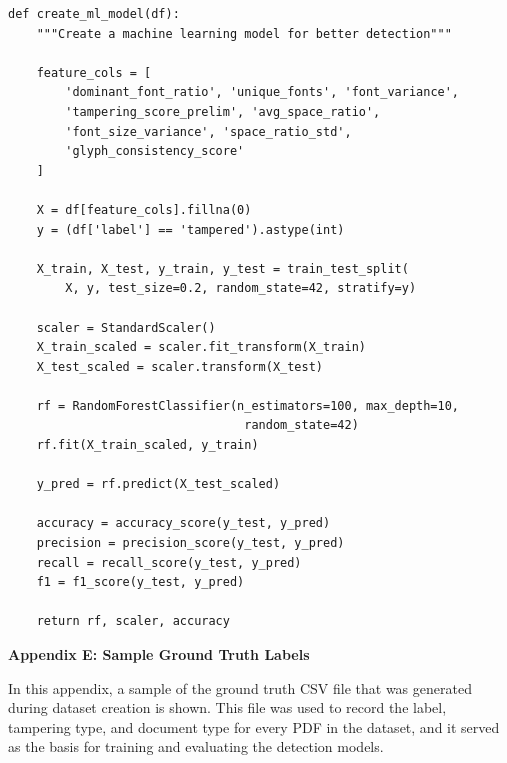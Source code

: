 \small
\begin{verbatim}
def create_ml_model(df):
    """Create a machine learning model for better detection"""

    feature_cols = [
        'dominant_font_ratio', 'unique_fonts', 'font_variance',
        'tampering_score_prelim', 'avg_space_ratio',
        'font_size_variance', 'space_ratio_std',
        'glyph_consistency_score'
    ]

    X = df[feature_cols].fillna(0)
    y = (df['label'] == 'tampered').astype(int)

    X_train, X_test, y_train, y_test = train_test_split(
        X, y, test_size=0.2, random_state=42, stratify=y)

    scaler = StandardScaler()
    X_train_scaled = scaler.fit_transform(X_train)
    X_test_scaled = scaler.transform(X_test)

    rf = RandomForestClassifier(n_estimators=100, max_depth=10,
                                 random_state=42)
    rf.fit(X_train_scaled, y_train)

    y_pred = rf.predict(X_test_scaled)

    accuracy = accuracy_score(y_test, y_pred)
    precision = precision_score(y_test, y_pred)
    recall = recall_score(y_test, y_pred)
    f1 = f1_score(y_test, y_pred)

    return rf, scaler, accuracy
\end{verbatim}

\vspace{.2in}

\noindent
\textbf{Appendix E: Sample Ground Truth Labels}

\noindent
In this appendix, a sample of the ground truth CSV file that was generated during dataset creation is shown. This file was used to record the label, tampering type, and document type for every PDF in the dataset, and it served as the basis for training and evaluating the detection models.

